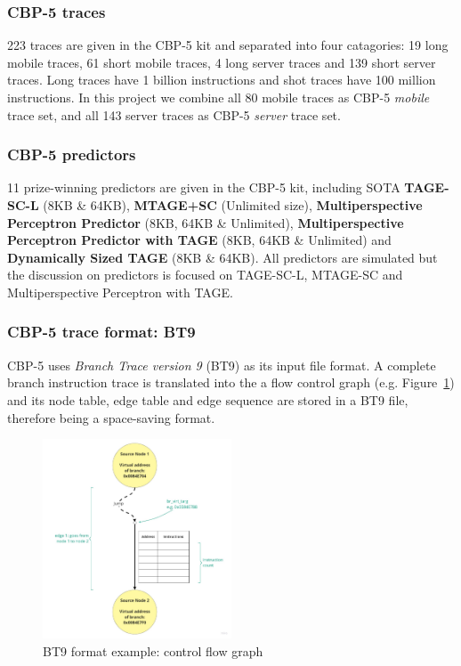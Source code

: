 \subsubsection{CBP-5 traces}
223 traces are given in the CBP-5 kit and separated into four catagories: 19 long mobile traces, 61 short mobile traces, 4 long server traces and 139 short server traces. Long traces have 1 billion instructions and shot traces have 100 million instructions. In this project we combine all 80 mobile traces as CBP-5 \textit{mobile} trace set, and all 143 server traces as CBP-5 \textit{server} trace set.

\subsubsection{CBP-5 predictors}
11 prize-winning predictors are given in the CBP-5 kit, including SOTA \textbf{TAGE-SC-L}\cite{seznec_tage-sc-l_2016} (8KB \& 64KB), \textbf{MTAGE+SC}\cite{seznec_exploring_2016} (Unlimited size),\textbf{ Multiperspective Perceptron Predictor}\cite{jimenez_multiperspective_2016} (8KB, 64KB \& Unlimited), \textbf{Multiperspective Perceptron Predictor with TAGE}\cite{jimenez_multiperspective_2016-1} (8KB, 64KB \& Unlimited) and \textbf{Dynamically Sized TAGE}\cite{pruett_dynamically_2016} (8KB \& 64KB). All predictors are simulated but the discussion on predictors is focused on TAGE-SC-L, MTAGE-SC and Multiperspective Perceptron with TAGE.

\subsubsection{CBP-5 trace format: BT9}
CBP-5 uses \textit{Branch Trace version 9} (BT9) as its input file format. A complete branch instruction trace is translated into the a flow control graph (e.g. Figure~\ref{fig:branch graph}) and its node table, edge table and edge sequence are stored in a BT9 file, therefore being a space-saving format.

\begin{figure}[h!] 
\centering    
\includegraphics[width=0.5\textwidth]{Chapter2/branch graph.jpg}
\caption{\centering BT9 format example: control flow graph}
\label{fig:branch graph}
\end{figure} 



